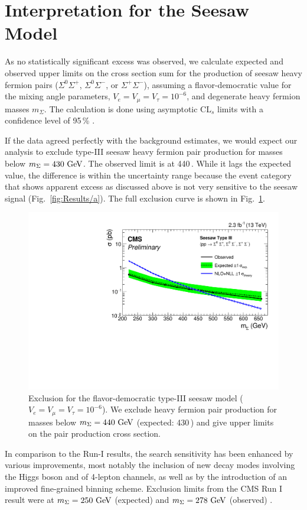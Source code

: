 \section{Interpretation for the Seesaw Model}
\label{sec:Interpretation}
\label{sec:Interpretation/Seesaw}

As no statistically significant excess was observed, we calculate expected and observed upper limits on the cross section sum for the production of seesaw heavy fermion pairs ($\Sigma^0\Sigma^+$, $\Sigma^0\Sigma^-$, or $\Sigma^+\Sigma^-$), assuming a flavor-democratic value for the mixing angle parameters, $V_e = V_\mu = V_\tau = 10^{-6}$, and degenerate heavy fermion masses $m_\Sigma$. The calculation is done using asymptotic CL$_s$ limits with a confidence level of 95\,\% \cite{Junk:1999kv,Read:2000ru,Read:2002hq}.

If the data agreed perfectly with the background estimates, we would expect our analysis to exclude type-III seesaw heavy fermion pair production for masses below $m_\Sigma = 430\,\,\text{Ge\hspace{-.08em}V}$. The observed limit is at 440\,\GeV. While it lags the expected value, the difference is within the uncertainty range because the event category that shows apparent excess as discussed above is not very sensitive to the seesaw signal (Fig.~\ref{fig:Results/a}). The full exclusion curve is shown in Fig.~\ref{fig:exclusion}.

\begin{figure}[t]
\begin{center}
	\includegraphics[width=.8\textwidth]{Results/exclusion}
	\caption{Exclusion for the flavor-democratic type-III seesaw model ($V_e = V_\mu = V_\tau = 10^{-6}$). We exclude heavy fermion pair production for masses below $m_\Sigma = 440\,\,\text{Ge\hspace{-.08em}V}$ (expected: 430\,\GeV) and give upper limits on the pair production cross section.
	\label{fig:exclusion}}
\end{center}
\end{figure}

In comparison to the Run-I results, the search sensitivity has been enhanced by various improvements, most notably the inclusion of new decay modes involving the Higgs boson and of 4-lepton channels, as well as by the introduction of an improved fine-grained binning scheme. Exclusion limits from the CMS Run I result were at $m_\Sigma = 250\,\,\text{Ge\hspace{-.08em}V}$ (expected) and $m_\Sigma = 278\,\,\text{Ge\hspace{-.08em}V}$ (observed) \cite{CMS-PAS-EXO-14-001}.
